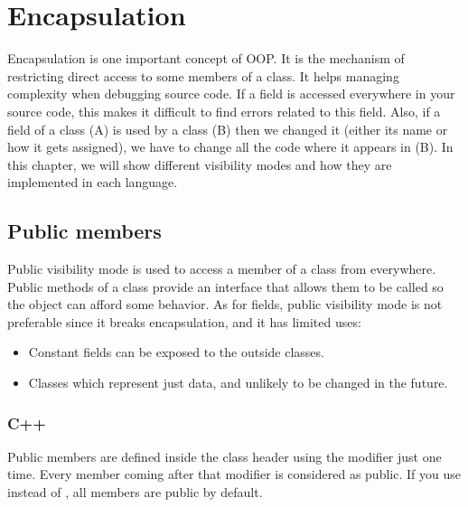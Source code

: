 \documentclass{KodeBook}
\begin{document}
\fi

\chapter{Encapsulation}

\begin{introduction}
	Encapsulation is one important concept of OOP. 
	It is the mechanism of restricting direct access to some members of a class.
	It helps managing complexity when debugging source code. 
	If a field is accessed everywhere in your source code, this makes it difficult to find errors related to this field. 
	Also, if a field of a class (A) is used by a class (B) then we changed it (either its name or how it gets assigned), we have to change all the code where it appears in (B).
	In this chapter, we will show different visibility modes and how they are implemented in each language.
\end{introduction}

\section{Public members}

Public visibility mode is used to access a member of a class from everywhere. 
Public methods of a class provide an interface that allows them to be called so the object can afford some behavior. 
As for fields, public visibility mode is not preferable since it breaks encapsulation, and it has limited uses:
\begin{itemize}
	\item Constant fields can be exposed to the outside classes.%
	\item Classes which represent just data, and unlikely to be changed in the future.
\end{itemize}

\subsection{C++}

Public members are defined inside the class header using the modifier  just one time. 
Every member coming after that modifier is considered as public.
If you use  instead of , all members are public by default.


\end{document}
